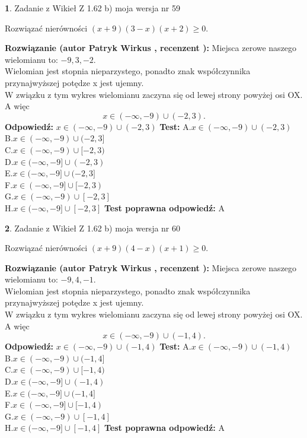 \documentclass[12pt, a4paper]{article}
\theoremstyle{definition} %
\newtheorem{zad}{}
\newcommand{\zadStart}[1]{\begin{zad}#1\newline}
\newcommand{\zadStop}{\end{zad}}
\newcommand{\rozwStart}[2]{\noindent \textbf{Rozwiązanie (autor #1 , recenzent #2): }\newline}
\newcommand{\rozwStop}{\newline}
\newcommand{\odpStart}{\noindent \textbf{Odpowiedź:}\newline}
\newcommand{\odpStop}{\newline}
\newcommand{\testStart}{\noindent \textbf{Test:}\newline}
\newcommand{\testStop}{\newline}
\newcommand{\kluczStart}{\noindent \textbf{Test poprawna odpowiedź:}\newline}
\newcommand{\kluczStop}{\newline}
\begin{document}
\zadStart{Zadanie z Wikieł Z 1.62 b) moja wersja nr 59}

Rozwiązać nierówności $(x+9)(3-x)(x+2)\ge0$.
\zadStop
\rozwStart{Patryk Wirkus}{}
Miejsca zerowe naszego wielomianu to: $-9, 3, -2$.\\
Wielomian jest stopnia nieparzystego, ponadto znak współczynnika przy\linebreak najwyższej potędze x jest ujemny.\\ W związku z tym wykres wielomianu zaczyna się od lewej strony powyżej osi OX. A więc $$x \in (-\infty,-9) \cup (-2,3).$$
\rozwStop
\odpStart
$x \in (-\infty,-9) \cup (-2,3)$
\odpStop
\testStart
A.$x \in (-\infty,-9) \cup (-2,3)$\\
B.$x \in (-\infty,-9) \cup (-2,3]$\\
C.$x \in (-\infty,-9) \cup [-2,3)$\\
D.$x \in (-\infty,-9] \cup (-2,3)$\\
E.$x \in (-\infty,-9] \cup (-2,3]$\\
F.$x \in (-\infty,-9] \cup [-2,3)$\\
G.$x \in (-\infty,-9) \cup [-2,3]$\\
H.$x \in (-\infty,-9] \cup [-2,3]$
\testStop
\kluczStart
A
\kluczStop



\zadStart{Zadanie z Wikieł Z 1.62 b) moja wersja nr 60}

Rozwiązać nierówności $(x+9)(4-x)(x+1)\ge0$.
\zadStop
\rozwStart{Patryk Wirkus}{}
Miejsca zerowe naszego wielomianu to: $-9, 4, -1$.\\
Wielomian jest stopnia nieparzystego, ponadto znak współczynnika przy\linebreak najwyższej potędze x jest ujemny.\\ W związku z tym wykres wielomianu zaczyna się od lewej strony powyżej osi OX. A więc $$x \in (-\infty,-9) \cup (-1,4).$$
\rozwStop
\odpStart
$x \in (-\infty,-9) \cup (-1,4)$
\odpStop
\testStart
A.$x \in (-\infty,-9) \cup (-1,4)$\\
B.$x \in (-\infty,-9) \cup (-1,4]$\\
C.$x \in (-\infty,-9) \cup [-1,4)$\\
D.$x \in (-\infty,-9] \cup (-1,4)$\\
E.$x \in (-\infty,-9] \cup (-1,4]$\\
F.$x \in (-\infty,-9] \cup [-1,4)$\\
G.$x \in (-\infty,-9) \cup [-1,4]$\\
H.$x \in (-\infty,-9] \cup [-1,4]$
\testStop
\kluczStart
A
\kluczStop
\end{document}
